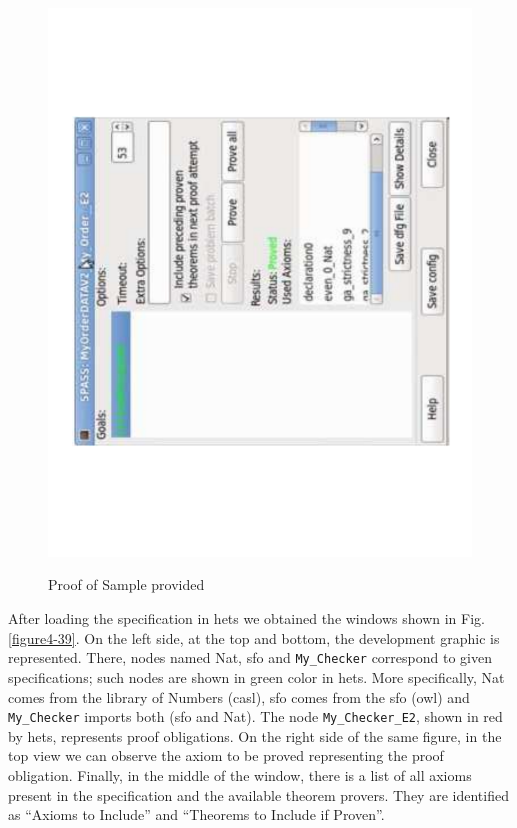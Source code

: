 \begin{figure}
\begin{minipage}{.5\textwidth}
		\includegraphics[scale=0.35, angle=270]{figure-chapterIV/fig4-40.pdf}\\
		\caption{Proof of Sample provided}
	\label{figure4-40}
\end{minipage}%
\end{figure}






After loading the specification in \gls{hets} we obtained the windows shown in Fig. \ref{figure4-39}.  On the left side, at the top and bottom, the development graphic is represented. There, nodes named Nat, \gls{sfo} and \texttt{My\_Checker} correspond to given specifications; such nodes are shown in green color in \gls{hets}. More specifically, Nat comes from the library of Numbers (\gls{casl}), \gls{sfo} comes from the \gls{sfo} (\gls{owl}) and \texttt{My\_Checker} imports both (\gls{sfo} and Nat). The node \texttt{My\_Checker\_E2}, shown in red by \gls{hets}, represents proof obligations. On the right side of the same figure, in the top  view we can observe the axiom to be proved representing the proof obligation. Finally, in the  middle of the  window, there is a list of all axioms present in the specification and the available theorem provers. They are identified as “Axioms to Include” and “Theorems to Include if Proven”.  

